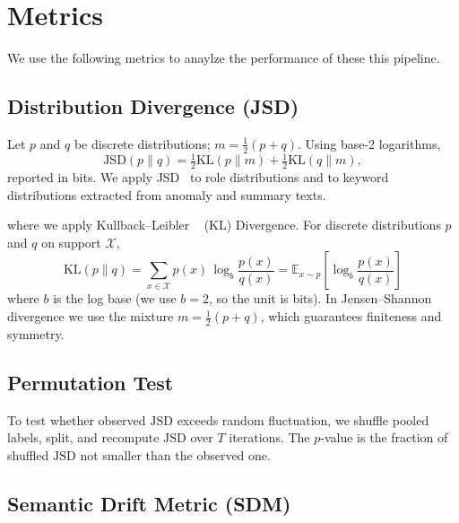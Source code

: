 \documentclass[conference]{IEEEtran}
\begin{document}
\section{Metrics}\label{sec:interpretations}

We use the following metrics to anaylze the performance of these this pipeline.
\subsection{Distribution Divergence (JSD)}
Let \(p\) and \(q\) be discrete distributions; \(m=\frac{1}{2}(p+q)\).
Using base-2 logarithms,
\begin{equation}
\mathrm{JSD}(p\parallel q)=\tfrac{1}{2}\mathrm{KL}(p\parallel m)+\tfrac{1}{2}\mathrm{KL}(q\parallel m),
\end{equation}
reported in bits. We apply JSD~\cite{lin1991jsd} to role distributions and to keyword distributions extracted from anomaly and summary texts.

where we apply {Kullback--Leibler ~\cite{kullback1951} (KL) Divergence.}
For discrete distributions $p$ and $q$ on support $\mathcal{X}$,
\begin{equation}
\mathrm{KL}(p\parallel q)
= \sum_{x\in\mathcal{X}} p(x)\,\log_b\!\frac{p(x)}{q(x)}
= \mathbb{E}_{x\sim p}\!\left[\log_b\!\frac{p(x)}{q(x)}\right]
\end{equation}
where $b$ is the log base (we use $b{=}2$, so the unit is bits). In Jensen--Shannon divergence we use the mixture $m=\tfrac{1}{2}(p+q)$, which guarantees finiteness and symmetry.



\subsection{Permutation Test}
To test whether observed \(\mathrm{JSD}\) exceeds random fluctuation, we shuffle pooled labels, split, and recompute \(\mathrm{JSD}\) over \(T\) iterations. The \(p\)-value is the fraction of shuffled \(\mathrm{JSD}\) not smaller than the observed one.

\subsection{Semantic Drift Metric (SDM)}
\end{document}
